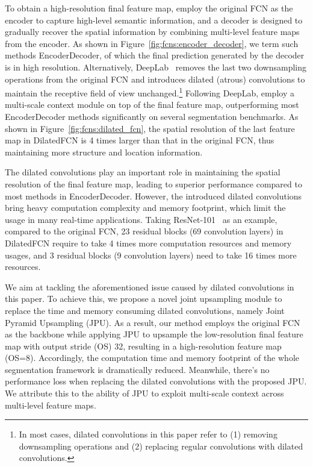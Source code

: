\documentclass[10pt,twocolumn,letterpaper]{article}
\begin{document}
To obtain a high-resolution final feature map, \cite{badrinarayanan2015segnet,ronneberger2015u,lin2017refinenet,wojna2017devil,pohlen2017full} employ the original FCN as the encoder to capture high-level semantic information, and a decoder is designed to gradually recover the spatial information by combining multi-level feature maps from the encoder.
As shown in Figure~\ref{fig:fcns:encoder_decoder}, we term such methods EncoderDecoder, of which the final prediction generated by the decoder is in high resolution.
Alternatively, DeepLab~\cite{chen2018deeplab} removes the last two downsampling operations from the original FCN and introduces dilated (atrous) convolutions to maintain the receptive field of view unchanged.\footnote{In most cases, dilated convolutions in this paper refer to (1) removing downsampling operations and (2) replacing regular convolutions with dilated convolutions.}
Following DeepLab, \cite{zhao2017pyramid,chen2017rethinking,zhang2018context} employ a multi-scale context module on top of the final feature map, outperforming most EncoderDecoder methods significantly on several segmentation benchmarks.
As shown in Figure~\ref{fig:fcns:dilated_fcn}, the spatial resolution of the last feature map in DilatedFCN is 4 times larger than that in the original FCN, thus maintaining more structure and location information.

The dilated convolutions play an important role in maintaining the spatial resolution of the final feature map, leading to superior performance compared to most methods in EncoderDecoder.
However, the introduced dilated convolutions bring heavy computation complexity and memory footprint, which limit the usage in many real-time applications.
Taking ResNet-101~\cite{he2016deep} as an example, compared to the original FCN, 23 residual blocks (69 convolution layers) in DilatedFCN require to take 4 times more computation resources and memory usages, and 3 residual blocks (9 convolution layers) need to take 16 times more resources.

We aim at tackling the aforementioned issue caused by dilated convolutions in this paper.
To achieve this, we propose a novel joint upsampling module to replace the time and memory consuming dilated convolutions, namely Joint Pyramid Upsampling (JPU).
As a result, our method employs the original FCN as the backbone while applying JPU to upsample the low-resolution final feature map with output stride (OS) 32, resulting in a high-resolution feature map (OS=8).
Accordingly, the computation time and memory footprint of the whole segmentation framework is dramatically reduced.
Meanwhile, there's no performance loss when replacing the dilated convolutions with the proposed JPU.
We attribute this to the ability of JPU to exploit multi-scale context across multi-level feature maps.
\end{document}
